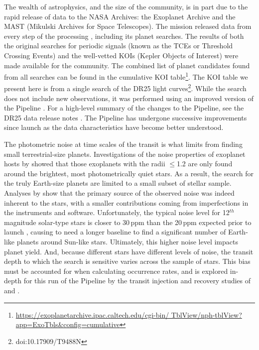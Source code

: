 The wealth of astrophysics, and the size of the \Kepler{} community, is in part due to the rapid release of \Kepler{} data to the NASA Archives: the Exoplanet Archive \citep[][]{Akeson2013} and the MAST (Mikulski Archives for Space Telescopes).  The \Kepler{} mission released data from every step of the processing \citep{Thompson2016KAM,Stumpe2014,Bryson2010b}, including its planet searches. The results of both the original searches for periodic signals (known as the TCEs or Threshold Crossing Events) and the well-vetted KOIs (Kepler Objects of Interest) were made available for the community. The combined list of  planet candidates found from all searches can be found in the cumulative KOI table\footnote{\url{https://exoplanetarchive.ipac.caltech.edu/cgi-bin/ TblView/nph-tblView?app=ExoTbls\&config=cumulative}}.  The KOI table we present here is from a single search of the DR25 light curves\footnote{doi:10.17909/T9488N}. While the search does not include new observations, it was performed using an improved version of the \Kepler{} Pipeline \citep[version 9.3,][]{Jenkins2017}. For a high-level summary of the changes to the \Kepler{} Pipeline, see the DR25 data release notes \citep{DRN25,KDCH}. The \Kepler{} Pipeline has undergone successive improvements since launch as the data characteristics have become better understood.

The photometric noise at time scales of the transit is what limits \Kepler{} from finding small terrestrial-size planets. Investigations of the noise properties of \Kepler{} exoplanet hosts by \citet{Howell2016} showed that those exoplanets with the radii $\leq$1.2\re{} are only found around the brightest, most photometrically quiet stars. As a result, the search for the truly Earth-size planets are limited to a small subset of  stellar sample.  Analyses by \citet{Gilliland2011,Gilliland2015} show that the primary source of the observed noise was indeed inherent to the stars, with a smaller contributions coming from imperfections in the instruments and software. Unfortunately, the typical noise level for 12$^{th}$ magnitude solar-type stars is closer to 30\,ppm \citep{Gilliland2015} than the 20\,ppm expected prior to launch \citep{Jenkins2002a}, causing \Kepler{} to need a longer baseline to find a significant number of Earth-like planets around Sun-like stars.   Ultimately, this higher noise level impacts  planet yield. And, because different stars have different levels of noise, the transit depth to which the search is sensitive varies across the sample of stars. This bias must be accounted for when calculating occurrence rates, and is explored in-depth for this run of the \Kepler{} Pipeline by the transit injection and recovery studies of \citet[][]{Burke2017b,Burke2017a} and \citet{Christiansen2017}.
 

